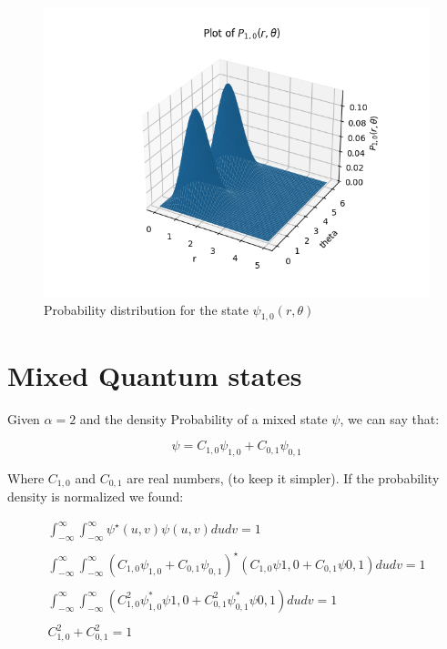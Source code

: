 \begin{figure}
  \centering
  \includegraphics{images8/P_1,0(r).png}
  \caption{Probability distribution for the state $\psi_{1,0}(r,\theta)$}
\end{figure}

\section{Mixed Quantum states}

Given $\alpha = 2$ and the density Probability of a mixed state $\psi$, we can say that:

\begin{equation}
  \psi = C_{1,0} \psi_{1,0} + C_{0,1} \psi_{0,1}
\end{equation}

Where $C_{1,0}$ and $C_{0,1}$ are real numbers, (to keep it simpler). If the probability density is normalized we found:

\begin{equation}
  \begin{array}{c}
    \int_{-\infty}^{\infty} \int_{-\infty}^{\infty} \psi^{\star}(u,v)\psi(u,v) du dv = 1
    \\

    \\
    \int_{-\infty}^{\infty} \int_{-\infty}^{\infty} \left(C_{1,0} \psi_{1,0} + C_{0,1} \psi_{0,1}\right)^{\star} \left(C_{1,0} \psi{1,0} + C_{0,1} \psi{0,1}\right) du dv = 1
    \\

    \\
    \int_{-\infty}^{\infty} \int_{-\infty}^{\infty} \left(C_{1,0}^2 \psi^*_{1,0} \psi{1,0} + C_{0,1}^2 \psi^*_{0,1} \psi{0,1}\right) du dv = 1
    \\

    \\
    C_{1,0}^2 + C_{0,1}^2 = 1
  \end{array}
\end{equation}

